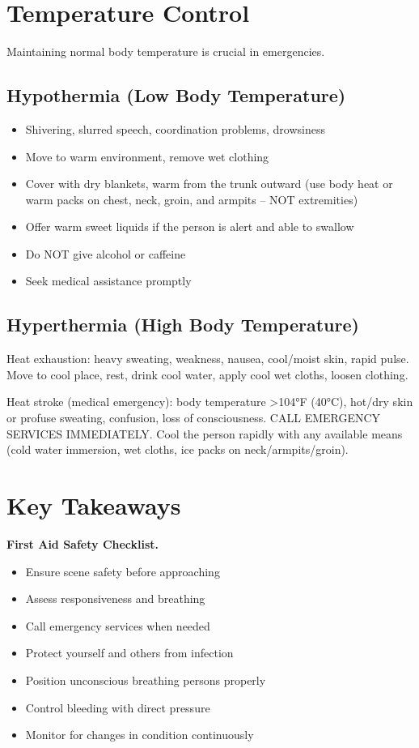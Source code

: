 \section{Temperature Control}

Maintaining normal body temperature is crucial in emergencies.

\subsection{Hypothermia (Low Body Temperature)}

\begin{itemize}[leftmargin=*]
  \item Shivering, slurred speech, coordination problems, drowsiness
  \item Move to warm environment, remove wet clothing
  \item Cover with dry blankets, warm from the trunk outward (use body heat or warm packs on chest, neck, groin, and armpits -- NOT extremities)
  \item Offer warm sweet liquids if the person is alert and able to swallow
  \item Do NOT give alcohol or caffeine
  \item Seek medical assistance promptly
\end{itemize}

\subsection{Hyperthermia (High Body Temperature)}

Heat exhaustion: heavy sweating, weakness, nausea, cool/moist skin, rapid pulse. Move to cool place, rest, drink cool water, apply cool wet cloths, loosen clothing.

Heat stroke (medical emergency): body temperature >104°F (40°C), hot/dry skin or profuse sweating, confusion, loss of consciousness. CALL EMERGENCY SERVICES IMMEDIATELY. Cool the person rapidly with any available means (cold water immersion, wet cloths, ice packs on neck/armpits/groin).

\section{Key Takeaways}

\medskip\noindent\textbf{First Aid Safety Checklist.}
\begin{itemize}
  \item Ensure scene safety before approaching
  \item Assess responsiveness and breathing
  \item Call emergency services when needed
  \item Protect yourself and others from infection
  \item Position unconscious breathing persons properly
  \item Control bleeding with direct pressure
  \item Monitor for changes in condition continuously
\end{itemize}

